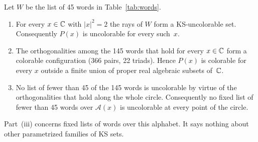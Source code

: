 \begin{theorem}\label{thm:circle}
Let $W$ be the list of 45 words in Table~\ref{tab:words}.
\begin{enumerate}
\item[(i)] For every $x\in\mathbb{C}$ with $|x|^2=2$ the rays of $W$ form a KS-uncolorable set.
Consequently $P(x)$ is uncolorable for every such~$x$.
\item[(ii)] The orthogonalities among the 145 words that hold for every $x\in\mathbb{C}$ form a colorable
configuration (366 pairs, 22 triads).  Hence $P(x)$ is colorable for every $x$ outside a finite
union of proper real algebraic subsets of~$\mathbb{C}$.
\item[(iii)] No list of fewer than 45 of the 145 words is uncolorable by virtue of the
orthogonalities that hold along the whole circle.  Consequently no fixed list of fewer than 45
words over $\mathcal A(x)$ is uncolorable at every point of the circle.
\end{enumerate}
Part~(iii) concerns fixed lists of words over this alphabet.  It says nothing about other
parametrized families of KS sets.
\end{theorem}

